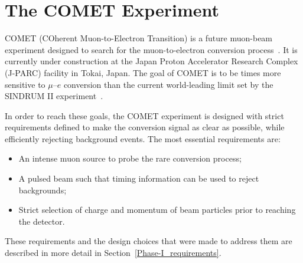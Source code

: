\chapter{The COMET Experiment}\label{chapter2}







COMET (COherent Muon-to-Electron Transition) is a future muon-beam experiment
designed to search for the muon-to-electron conversion
process~\cite{the_comet_collaboration_comet_2020}. It is currently under
construction at the Japan Proton Accelerator Research Complex (J-PARC) facility
in Tokai, Japan. The goal of COMET is to be  times more
sensitive to $\mu$--$e$ conversion than the current world-leading limit set by
the SINDRUM II experiment~\cite{Bertl:2006up}. 

In order to reach these goals, the COMET experiment is designed with strict
requirements defined to make the conversion signal as clear as possible, while
efficiently rejecting background events. The most essential requirements are:
\begin{itemize}
    \item An intense muon source to probe the rare conversion process;
    \item A pulsed beam such that timing information can be used to reject backgrounds;
    \item Strict selection of charge and momentum of beam particles prior to
    reaching the detector.
\end{itemize}
These requirements and the design choices that were made to address them are
described in more detail in Section~\ref{Phase-I_requirements}.

